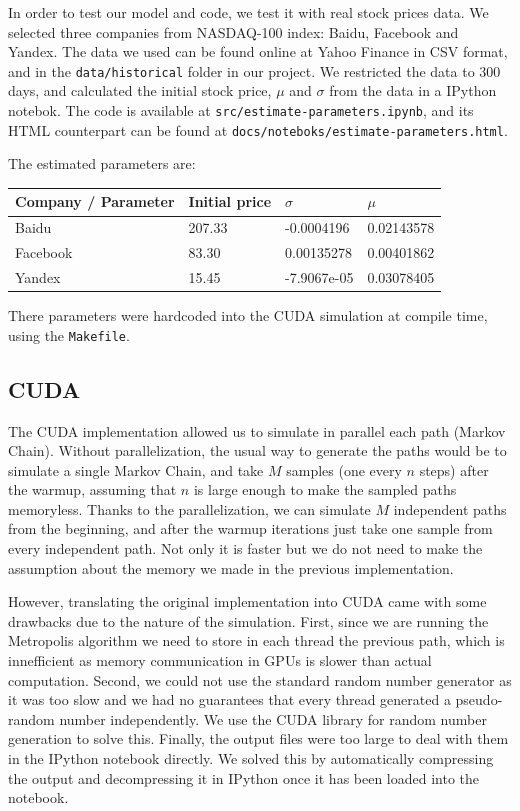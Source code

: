 \documentclass[%
 reprint,
 amsmath,amssymb,
 aps,
 nofootinbib,
 showpacs
]{revtex4-1}
\begin{document}
In order to test our model and code, we test it with real stock prices data.
We selected three companies from NASDAQ-100 index: Baidu, Facebook and Yandex.
The data we used can be found online at Yahoo Finance in CSV format, and in the \texttt{data/historical} folder in our project.
We restricted the data to $300$ days, and calculated the initial stock price, $\mu$ and $\sigma$ from the data in a IPython notebok.
The code is available at \texttt{src/estimate-parameters.ipynb}, and its HTML counterpart can be found at \texttt{docs/noteboks/estimate-parameters.html}.

The estimated parameters are:
\begin{table}[ht]
\centering
\begin{tabular}{|l|l|l|l|}
\hline
Company / Parameter & Initial price & $\sigma$    & $\mu$      \\
\hline
Baidu               & 207.33        & -0.0004196  & 0.02143578 \\
\hline
Facebook            & 83.30         & 0.00135278  & 0.00401862 \\
\hline
Yandex              & 15.45         & -7.9067e-05 & 0.03078405 \\
\hline
\end{tabular}
\end{table}

There parameters were hardcoded into the CUDA simulation at compile time, using the \texttt{Makefile}.

\subsection{CUDA}

The CUDA implementation allowed us to simulate in parallel each path (Markov Chain).
Without parallelization, the usual way to generate the paths would be to simulate a single Markov Chain, and take $M$ samples (one every $n$ steps) after the warmup, assuming that $n$ is large enough to make the sampled paths memoryless.
Thanks to the parallelization, we can simulate $M$ independent paths from the beginning, and after the warmup iterations just take one sample from every independent path.
Not only it is faster but we do not need to make the assumption about the memory we made in the previous implementation.

However, translating the original implementation into CUDA came with some drawbacks due to the nature of the simulation.
First, since we are running the Metropolis algorithm we need to store in each thread the previous path, which is innefficient as memory communication in GPUs is slower than actual computation.
Second, we could not use the standard random number generator as it was too slow and we had no guarantees that every thread generated a pseudo-random number independently. We use the CUDA library for random number generation to solve this.
Finally, the output files were too large to deal with them in the IPython notebook directly.
We solved this by automatically compressing the output and decompressing it in IPython once it has been loaded into the notebook.
\end{document}
